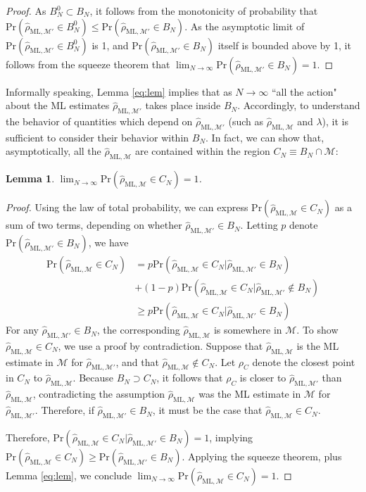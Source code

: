 \documentclass[aps,pra, twocolumn]{revtex4-1}
\newcommand{\M}{\mathcal{M}}
\newcommand{\rhohat}{\hat{\rho}}
\newcommand{\rhoML}[1]{\rhohat_{\scriptscriptstyle{\mathrm{ML},#1}}}
\newtheorem{lem}{Lemma}
\begin{document}
\begin{proof}
As $B^{0}_{N} \subset B_{N}$, it follows from the monotonicity of probability that $\mathrm{Pr}(\rhoML{\M'} \in B^{0}_{N}) \leq \mathrm{Pr}(\rhoML{\M'} \in B_{N})$. As the asymptotic limit of $\mathrm{Pr}(\rhoML{\M'} \in B^{0}_{N})$ is 1, and $\mathrm{Pr}(\rhoML{\M'} \in B_{N})$ itself is bounded above by 1, it follows from the squeeze theorem that $\lim_{N\rightarrow \infty}\mathrm{Pr}(\rhoML{\M'} \in B_{N})=1$.
\end{proof}

Informally speaking, Lemma \ref{eq:lem} implies that as $N\rightarrow \infty$ ``all the action" about the ML estimates $\rhoML{\M'}$ takes place inside $B_{N}$. Accordingly, to understand the behavior of quantities which depend on $\rhoML{\M'}$ (such as $\rhoML{\M}$ and $\lambda$), it is sufficient to consider their behavior within $B_{N}$. In fact, we can show that, asymptotically, all the $\rhoML{\M}$ are contained within the region $C_{N} \equiv B_{N} \cap \M$:

\begin{lem}
\label{eq:rhoMLlem}
$\lim_{N\rightarrow \infty}\mathrm{Pr}(\rhoML{\M} \in C_{N}) = 1$.
\end{lem}
\begin{proof}
Using the law of total probability, we can express $\mathrm{Pr}(\rhoML{\M} \in C_{N})$ as a sum of two terms, depending on whether $\rhoML{\M'} \in B_{N}$. Letting $p$ denote $\mathrm{Pr}(\rhoML{\M'} \in B_{N})$, we have
\begin{align*}
\mathrm{Pr}(\rhoML{\M} \in C_{N}) &= p\mathrm{Pr}(\rhoML{\M} \in C_{N} | \rhoML{\M'} \in B_{N})\\
&+(1-p)\mathrm{Pr}(\rhoML{\M} \in C_{N} | \rhoML{\M'} \not\in B_{N})\\
& \geq p\mathrm{Pr}(\rhoML{\M} \in C_{N} | \rhoML{\M'} \in B_{N})
\end{align*}
For any $\rhoML{\M'} \in B_{N}$, the corresponding $\rhoML{\M}$ is somewhere in $\M$. To show $\rhoML{\M} \in C_{N}$, we use a proof by contradiction. Suppose that $\rhoML{\M}$ is the ML estimate in $\M$ for $\rhoML{\M'}$, and that $\rhoML{\M} \not \in C_{N}$. Let $\rho_{C}$ denote the closest point in $C_{N}$ to $\rhoML{\M}$. Because $B_{N} \supset C_{N}$, it follows that $\rho_{C}$ is closer to $\rhoML{\M'}$ than $\rhoML{\M}$, contradicting the assumption $\rhoML{\M}$ was the ML estimate in $\M$ for $\rhoML{\M'}$. Therefore, if $\rhoML{\M'} \in B_{N}$, it must be the case that $\rhoML{\M} \in C_{N}$.

Therefore, $\mathrm{Pr}(\rhoML{\M} \in C_{N} | \rhoML{\M'} \in B_{N}) = 1$, implying $\mathrm{Pr}(\rhoML{\M} \in C_{N}) \geq \mathrm{Pr}(\rhoML{\M'} \in B_{N})$. Applying the squeeze theorem, plus Lemma \ref{eq:lem}, we conclude $\lim_{N\rightarrow \infty}\mathrm{Pr}(\rhoML{\M} \in C_{N}) = 1$.
\end{proof}
\end{document}
